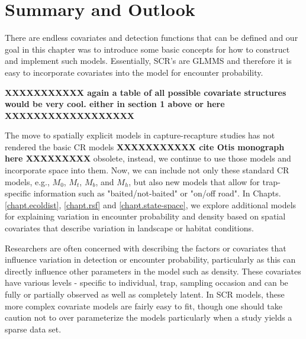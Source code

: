 \section{Summary and Outlook}

There are endless covariates and detection functions that can be defined
and our goal in this chapter was to introduce some basic concepts for how
to construct and implement such models.  Essentially, SCR's are GLMMS and
therefore it is easy to incorporate covariates into the model for encounter
probability.

{\bf XXXXXXXXXXX again a table of all possible covariate structures
  would be very cool. either in section 1 above or here XXXXXXXXXXXXXXXXXX}

The move to spatially explicit models in capture-recapture studies has not rendered the
basic CR models {\bf XXXXXXXXXXX cite Otis monograph here XXXXXXXXX} 
obsolete, instead, we continue to use those models and incorporate
space into them. Now, we can include not only these standard CR models, 
e.g., $M_0$, $M_t$, $M_b$, and $M_h$, but also new models that allow for trap-specific
information such as "baited/not-baited" or "on/off road".  In
Chapts. \ref{chapt.ecoldist}, \ref{chapt.rsf} and
\ref{chapt.state-space}, we explore additional models 
for explaining variation in encounter probability and density
based on spatial covariates that describe variation in landscape or
habitat conditions. 

Researchers are often concerned with describing the factors or covariates that influence
variation in detection or encounter probability, particularly as this can directly influence
other parameters in the model such as density.  These covariates have various levels - specific
to individual, trap, sampling occasion and can be fully or partially observed as well as 
completely latent.  In SCR models, these more complex covariate models are fairly easy to fit, 
though one should take caution not to over parameterize the models
particularly when a study yields a sparse data set.


\begin{comment}

Different detection models: We can make up detection models {\it all fucking
day}, to no end, with no point, and with no biological justification for
any single model. To us this would be bad practice and so we think it is
perfectly fine to pick a model ahead of time and stick with it.

we note that underlying these different models is basically something
to do with the 2nd moment structure of some correlated spatial process...
i.e., correlation functions (Higdon et al. 1998; etc...) and , insofar
as chooing detection functions is like choosing a correlation function,
it probably wont have much affect on inferences.
\end{comment}